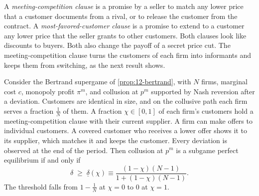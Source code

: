 A \emph{meeting-competition clause} is a promise by a seller to match any lower price that a customer documents
from a rival, or to release the customer from the contract. A \emph{most-favored-customer clause} is a promise to
extend to a customer any lower price that the seller grants to other customers. Both clauses look like discounts
to buyers. Both also change the payoff of a secret price cut. The meeting-competition clause turns the customers of
each firm into informants and keeps them from switching, as the next result shows.

\begin{proposition}\label{prop:12-mcc}
Consider the Bertrand supergame of \cref{prop:12-bertrand}, with $N$ firms, marginal cost $c$, monopoly profit
$\pi^m$, and collusion at $p^m$ supported by Nash reversion after a deviation. Customers are identical in size,
and on the collusive path each firm serves a fraction $\frac{1}{N}$ of them. A fraction $\chi \in [0,1]$ of each
firm's customers hold a meeting-competition clause with their current supplier. A firm can make offers to
individual customers. A covered customer who receives a lower offer shows it to its supplier, which matches it
and keeps the customer. Every deviation is observed at the end of the period. Then collusion at $p^m$ is a
subgame perfect equilibrium if and only if
\begin{equation}\label{eq:12-mcc}
  \delta \;\ge\; \underline\delta(\chi) \equiv \frac{(1-\chi)(N-1)}{1 + (1-\chi)(N-1)} .
\end{equation}
The threshold falls from $1 - \frac{1}{N}$ at $\chi = 0$ to $0$ at $\chi = 1$.
\end{proposition}

